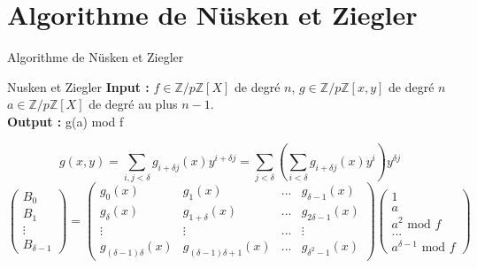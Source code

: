 \documentclass[10pt,a4paper]{beamer}
\begin{document}
\begin{frame}
\begin{columns}
\begin{figure}
            \end{figure}
    \end{columns}
\end{frame}


\section{Algorithme de Nüsken et Ziegler}
\begin{frame}{Algorithme de Nüsken et Ziegler}
    \begin{block}{Nusken et Ziegler}
        \textbf{Input :} $f \in \mathbb{Z}/p\mathbb{Z}[X]$ de degré $n$, $g \in \mathbb{Z}/p\mathbb{Z}[x,y]$ de degré $n$ $a \in \mathbb{Z}/p\mathbb{Z}[X]$ de degré au plus $n-1$. \\
        \textbf{Output :} g(a) mod f
    \end{block}

    \[
    g(x,y) = \sum_{i,j<\delta}g_{i+\delta j}(x)y^{i+\delta j} = \sum_{j<\delta} \left( \sum_{i<\delta} g_{i+\delta j}(x)y^i \right) y^{\delta j}     
    \]
    \[
    \begin{pmatrix}
        B_0 \\
        B_1 \\
        \vdots \\
        B_{\delta-1}
    \end{pmatrix}
    =
    \begin{pmatrix}
        g_0(x)&g_1(x)&...&g_{\delta -1}(x) \\
        g_{\delta}(x)&g_{1+\delta}(x)&...&g_{2\delta-1}(x) \\
        \vdots&\vdots&...&\vdots \\
        g_{(\delta-1)\delta}(x)&g_{(\delta-1)\delta+1}(x)&...&g_{\delta^2-1}(x)
    \end{pmatrix}
    \begin{pmatrix}
        1 \\
        a \\
        a^2 \text{ mod }f \\
        ... \\
        a^{\delta-1} \text{ mod }f
    \end{pmatrix}
    \]
    

    
\end{frame}
\end{document}
